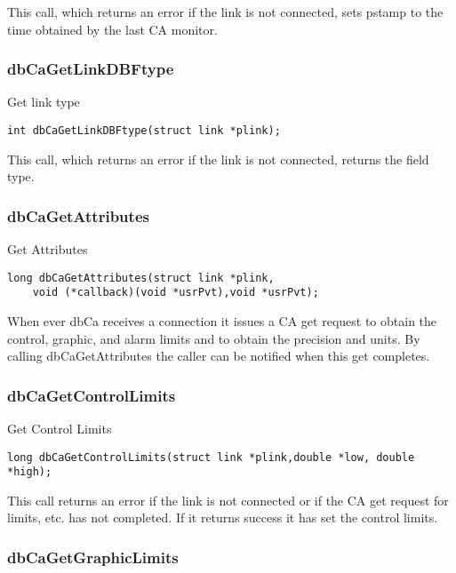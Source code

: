 This call, which returns an error if the link is not connected, sets pstamp to the time obtained by the last CA monitor.

\subsubsection{dbCaGetLinkDBFtype}

Get link type

\begin{verbatim}
int dbCaGetLinkDBFtype(struct link *plink);
\end{verbatim}

This call, which returns an error if the link is not connected, returns the field type.

\subsubsection{dbCaGetAttributes}

Get Attributes

\begin{verbatim}
long dbCaGetAttributes(struct link *plink,
    void (*callback)(void *usrPvt),void *usrPvt);
\end{verbatim}

When ever dbCa receives a connection it issues a CA get request to obtain the control, graphic, and alarm limits and to 
obtain the precision and units. By calling dbCaGetAttributes the caller can be notified when this get completes.

\subsubsection{dbCaGetControlLimits}

Get Control Limits

\begin{verbatim}
long dbCaGetControlLimits(struct link *plink,double *low, double *high);
\end{verbatim}

This call returns an error if the link is not connected or if the CA get request for limits, etc. has not completed. If it returns 
success it has set the control limits.

\subsubsection{dbCaGetGraphicLimits}

